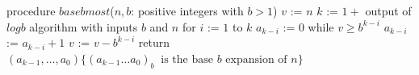 

\begin{algorithm}[caption={Calculating base $b$ expansion, from left}]
procedure $\textit{basebmost}$($n, b$: positive integers with $b > 1$)
$v$ := $n$
$k$ := $1 + $ output of $logb$ algorithm with inputs $b$ and $n$
for $i$ := $1$ to $k$
  $a_{k-i}$ := $0$
  while $v \geq b^{k-i}$
    $a_{k-i}$ := $a_{k-i} + 1$
    $v$ := $v -  b^{k-i}$
return $(a_{k-1}, \ldots, a_0) \{(a_{k-1} \ldots a_0)_b~\textrm{ is the base } b \textrm{ expansion of } n \}$
\end{algorithm}
